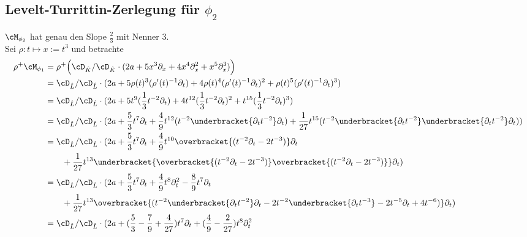\subsection{Levelt-Turrittin-Zerlegung für $\phi_2$}
$\cM_{\phi_2}$ hat genau den Slope $\frac{2}{3}$ mit Nenner $3$.\\
Sei $\rho:t\mapsto x:=t^3$ und betrachte 
\begin{align*}
\rho^+\cM_{\phi_1} &= \rho^+\Big( \cD_{\hat K}/\cD_{\hat
  K}\cdot(2a+5x^3\partial_x+4x^{4}\partial_x^2+x^5\partial_x^3) \Big) \\
&= \cD_{\hat L}/\cD_{\hat L}\cdot(2a+
  5\rho(t)^3(\rho'(t)^{-1}\partial_t)
  +4\rho(t)^{4}(\rho'(t)^{-1}\partial_t)^2
  +\rho(t)^5(\rho'(t)^{-1}\partial_t)^3) \\
&= \cD_{\hat L}/\cD_{\hat L}\cdot(2a+
  5t^9(\frac{1}{3}t^{-2}\partial_t)
  +4t^{12}(\frac{1}{3}t^{-2}\partial_t)^2
  +t^{15}(\frac{1}{3}t^{-2}\partial_t)^3) \\
&= \cD_{\hat L}/\cD_{\hat L}\cdot(2a+
  \frac{5}{3}t^7\partial_t
  +\frac{4}{9}t^{12}(t^{-2}
    \underbracket{\partial_tt^{-2}}
    \partial_t)
  +\frac{1}{27}t^{15}(t^{-2}
    \underbracket{\partial_tt^{-2}}
    \underbracket{\partial_tt^{-2}}
    \partial_t)) \\
&\begin{aligned}
&= \cD_{\hat L}/\cD_{\hat L}\cdot(2a+
  \frac{5}{3}t^7\partial_t
  +\frac{4}{9}t^{10}
    \overbracket{(t^{-2}\partial_t-2t^{-3})}
    \partial_t\\
  &\qquad+\frac{1}{27}t^{13}
    \underbracket{
      \overbracket{(t^{-2}\partial_t-2t^{-3})}
      \overbracket{(t^{-2}\partial_t-2t^{-3})}
    }
    \partial_t) \\
\end{aligned}\\
&\begin{aligned}
&= \cD_{\hat L}/\cD_{\hat L}\cdot(2a+
  \frac{5}{3}t^7\partial_t
  +\frac{4}{9}t^{8}\partial_t^2
  -\frac{8}{9}t^{7}\partial_t\\
  &\qquad+\frac{1}{27}t^{13}
    \overbracket{(
      t^{-2}\underbracket{\partial_tt^{-2}}\partial_t
      -2t^{-2}\underbracket{\partial_tt^{-3}}
      -2t^{-5}\partial_t
      +4t^{-6}
    )}
    \partial_t) \\
\end{aligned}\\
&\begin{aligned}
  &= \cD_{\hat L}/\cD_{\hat L}\cdot(2a+
    (\frac{5}{3}-\frac{7}{9}+\frac{4}{27})t^7\partial_t
    +(\frac{4}{9}-\frac{2}{27})t^{8}\partial_t^2

\end{aligned}
\end{align*}
